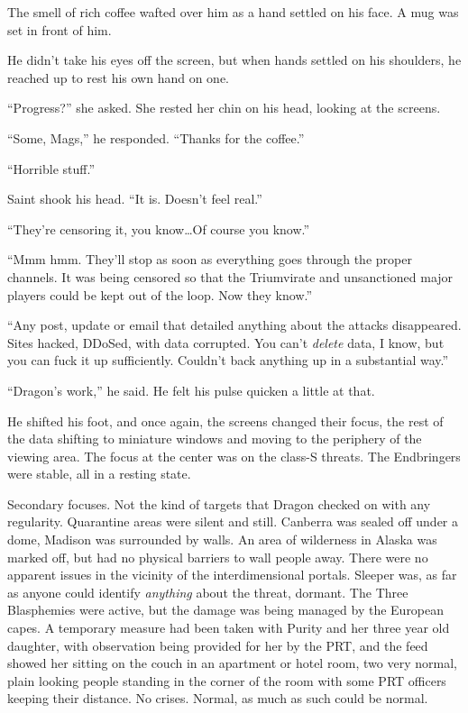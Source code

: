 The smell of rich coffee wafted over him as a hand settled on his face.  A mug was set in front of him.



He didn't take his eyes off the screen, but when hands settled on his shoulders, he reached up to rest his own hand on one.



``Progress?'' she asked.  She rested her chin on his head, looking at the screens.



``Some, Mags,'' he responded.  ``Thanks for the coffee.''



``Horrible stuff.''



Saint shook his head.  ``It is.  Doesn't feel real.''



``They're censoring it, you know\ldots Of course you know.''



``Mmm hmm.  They'll stop as soon as everything goes through the proper channels.  It was being censored so that the Triumvirate and unsanctioned major players could be kept out of the loop.  Now they know.''



``Any post, update or email that detailed anything about the attacks disappeared.  Sites hacked, DDoSed, with data corrupted.  You can't \emph{delete} data, I know, but you can fuck it up sufficiently.  Couldn't back anything up in a substantial way.''



``Dragon's work,'' he said.  He felt his pulse quicken a little at that.



He shifted his foot, and once again, the screens changed their focus, the rest of the data shifting to miniature windows and moving to the periphery of the viewing area.  The focus at the center was on the class-S threats.  The Endbringers were stable, all in a resting state.



Secondary focuses.  Not the kind of targets that Dragon checked on with any regularity.  Quarantine areas were silent and still.  Canberra was sealed off under a dome, Madison was surrounded by walls.  An area of wilderness in Alaska was marked off, but had no physical barriers to wall people away.  There were no apparent issues in the vicinity of the interdimensional portals.  Sleeper was, as far as anyone could identify \emph{anything }about the threat, dormant.  The Three Blasphemies were active, but the damage was being managed by the European capes.  A temporary measure had been taken with Purity and her three year old daughter, with observation being provided for her by the PRT, and the feed showed her sitting on the couch in an apartment or hotel room, two very normal, plain looking people standing in the corner of the room with some PRT officers keeping their distance.   No crises.  Normal, as much as such could be normal.




